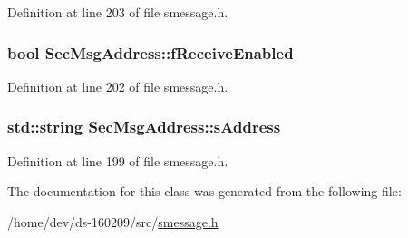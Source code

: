 Definition at line 203 of file smessage.\+h.

\hypertarget{class_sec_msg_address_a7413861d7bc9036c5f832528ec7fa3ff}{}
\subsubsection[{f\+Receive\+Enabled}]{\setlength{\rightskip}{0pt plus 5cm}bool Sec\+Msg\+Address\+::f\+Receive\+Enabled}\label{class_sec_msg_address_a7413861d7bc9036c5f832528ec7fa3ff}


Definition at line 202 of file smessage.\+h.

\hypertarget{class_sec_msg_address_a75c5e24741cf29ee640244e0bf6d8ec4}{}
\subsubsection[{s\+Address}]{\setlength{\rightskip}{0pt plus 5cm}std\+::string Sec\+Msg\+Address\+::s\+Address}\label{class_sec_msg_address_a75c5e24741cf29ee640244e0bf6d8ec4}


Definition at line 199 of file smessage.\+h.



The documentation for this class was generated from the following file\+:\begin{DoxyCompactItemize}
\item 
/home/dev/ds-\/160209/src/\hyperlink{smessage_8h}{smessage.\+h}\end{DoxyCompactItemize}
